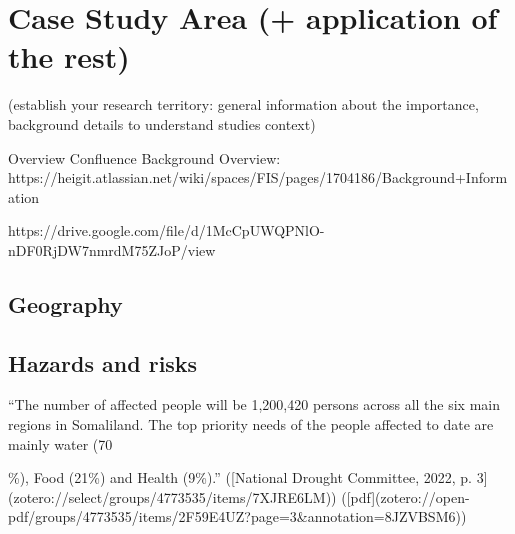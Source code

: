 {%


\section{Case Study Area (+ application of the rest)}


(establish your research territory: general information about the importance, background details to understand studies context)

Overview Confluence Background Overview:
https://heigit.atlassian.net/wiki/spaces/FIS/pages/1704186/Background+Information

https://drive.google.com/file/d/1McCpUWQPNlO-nDF0RjDW7nmrdM75ZJoP/view
\subsection{Geography}



\subsection{Hazards and risks}

“The number of affected people will be 1,200,420 persons across all the six main regions in Somaliland. The top priority needs of the people affected to date are mainly water (70{\%), Food (21\%) and Health (9\%).” ([National Drought Committee, 2022, p. 3](zotero://select/groups/4773535/items/7XJRE6LM)) ([pdf](zotero://open-pdf/groups/4773535/items/2F59E4UZ?page=3&annotation=8JZVBSM6))


}}
